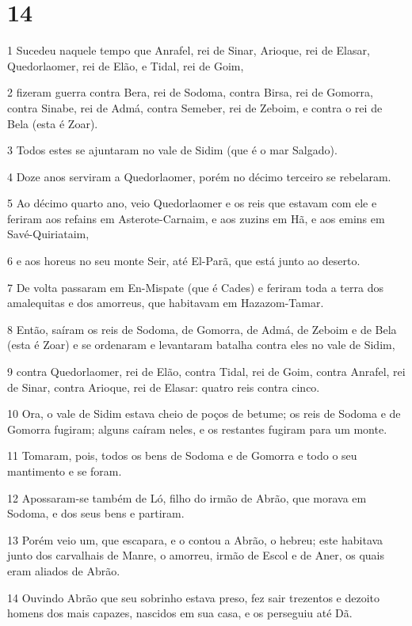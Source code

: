 \chapter{14}

\par 1 Sucedeu naquele tempo que Anrafel, rei de Sinar, Arioque, rei de Elasar, Quedorlaomer, rei de Elão, e Tidal, rei de Goim,
\par 2 fizeram guerra contra Bera, rei de Sodoma, contra Birsa, rei de Gomorra, contra Sinabe, rei de Admá, contra Semeber, rei de Zeboim, e contra o rei de Bela (esta é Zoar).
\par 3 Todos estes se ajuntaram no vale de Sidim (que é o mar Salgado).
\par 4 Doze anos serviram a Quedorlaomer, porém no décimo terceiro se rebelaram.
\par 5 Ao décimo quarto ano, veio Quedorlaomer e os reis que estavam com ele e feriram aos refains em Asterote-Carnaim, e aos zuzins em Hã, e aos emins em Savé-Quiriataim,
\par 6 e aos horeus no seu monte Seir, até El-Parã, que está junto ao deserto.
\par 7 De volta passaram em En-Mispate (que é Cades) e feriram toda a terra dos amalequitas e dos amorreus, que habitavam em Hazazom-Tamar.
\par 8 Então, saíram os reis de Sodoma, de Gomorra, de Admá, de Zeboim e de Bela (esta é Zoar) e se ordenaram e levantaram batalha contra eles no vale de Sidim,
\par 9 contra Quedorlaomer, rei de Elão, contra Tidal, rei de Goim, contra Anrafel, rei de Sinar, contra Arioque, rei de Elasar: quatro reis contra cinco.
\par 10 Ora, o vale de Sidim estava cheio de poços de betume; os reis de Sodoma e de Gomorra fugiram; alguns caíram neles, e os restantes fugiram para um monte.
\par 11 Tomaram, pois, todos os bens de Sodoma e de Gomorra e todo o seu mantimento e se foram.
\par 12 Apossaram-se também de Ló, filho do irmão de Abrão, que morava em Sodoma, e dos seus bens e partiram.
\par 13 Porém veio um, que escapara, e o contou a Abrão, o hebreu; este habitava junto dos carvalhais de Manre, o amorreu, irmão de Escol e de Aner, os quais eram aliados de Abrão.
\par 14 Ouvindo Abrão que seu sobrinho estava preso, fez sair trezentos e dezoito homens dos mais capazes, nascidos em sua casa, e os perseguiu até Dã.
